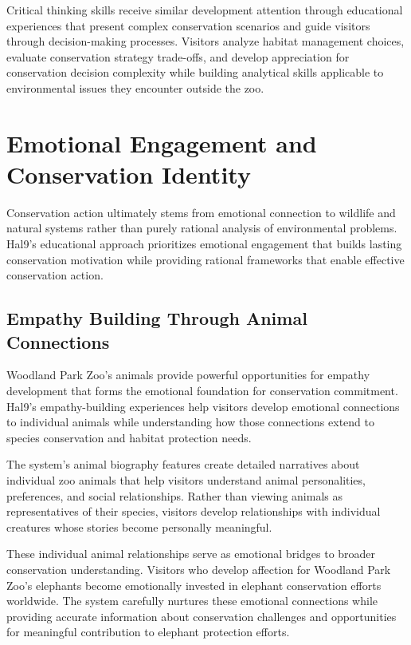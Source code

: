 \documentclass[
  Letterpaper,
]{scrbook}
\begin{document}
Critical thinking skills receive similar development attention through
educational experiences that present complex conservation scenarios and
guide visitors through decision-making processes. Visitors analyze
habitat management choices, evaluate conservation strategy trade-offs,
and develop appreciation for conservation decision complexity while
building analytical skills applicable to environmental issues they
encounter outside the zoo.

\section{Emotional Engagement and Conservation
Identity}\label{emotional-engagement-and-conservation-identity}

Conservation action ultimately stems from emotional connection to
wildlife and natural systems rather than purely rational analysis of
environmental problems. Hal9's educational approach prioritizes
emotional engagement that builds lasting conservation motivation while
providing rational frameworks that enable effective conservation action.

\subsection{Empathy Building Through Animal
Connections}\label{empathy-building-through-animal-connections}

Woodland Park Zoo's animals provide powerful opportunities for empathy
development that forms the emotional foundation for conservation
commitment. Hal9's empathy-building experiences help visitors develop
emotional connections to individual animals while understanding how
those connections extend to species conservation and habitat protection
needs.

The system's animal biography features create detailed narratives about
individual zoo animals that help visitors understand animal
personalities, preferences, and social relationships. Rather than
viewing animals as representatives of their species, visitors develop
relationships with individual creatures whose stories become personally
meaningful.

These individual animal relationships serve as emotional bridges to
broader conservation understanding. Visitors who develop affection for
Woodland Park Zoo's elephants become emotionally invested in elephant
conservation efforts worldwide. The system carefully nurtures these
emotional connections while providing accurate information about
conservation challenges and opportunities for meaningful contribution to
elephant protection efforts.
\end{document}
